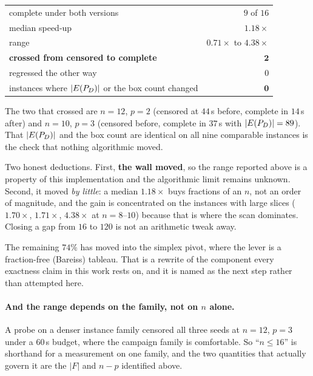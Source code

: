 \documentclass[11pt,a4paper]{article}
\begin{document}
\begin{center}
\begin{tabular}{lr}
\toprule
complete under both versions & $9$ of $16$ \\
\quad median speed-up & $\mathbf{1.18\times}$ \\
\quad range & $0.71\times$ to $4.38\times$ \\
\midrule
\textbf{crossed from censored to complete} & $\mathbf{2}$ \\
regressed the other way & $0$ \\
\midrule
instances where $|E(P_{D})|$ or the box count changed & $\mathbf{0}$ \\
\bottomrule
\end{tabular}
\end{center}

\noindent
The two that crossed are $n{=}12$, $p{=}2$ (censored at $44$\,s before, complete
in $14$\,s after) and $n{=}10$, $p{=}3$ (censored before, complete in $37$\,s
with $|E(P_{D})| = 89$).  That $|E(P_{D})|$ and the box count are identical on all nine
comparable instances is the check that nothing algorithmic moved.

Two honest deductions.  First, \textbf{the wall moved}, so the range reported
above is a property of this implementation and the algorithmic limit remains
unknown.  Second, it moved \emph{by little}: a median $1.18\times$ buys
fractions of an $n$, not an order of magnitude, and the gain is concentrated on
the instances with large slices ($1.70\times$, $1.71\times$, $4.38\times$ at
$n = 8$--$10$) because that is where the scan dominates.  Closing a gap from
$16$ to $120$ is not an arithmetic tweak away.

The remaining $74\%$ has moved into the simplex pivot, where the lever is a
fraction-free (Bareiss) tableau.  That is a rewrite of the component every
exactness claim in this work rests on, and it is named as the next step rather
than attempted here.

\paragraph{And the range depends on the family, not on $n$ alone.}
A probe on a denser instance family censored all three seeds at $n = 12$,
$p = 3$ under a $60$\,s budget, where the campaign family is comfortable.  So
``$n \leqslant 16$'' is shorthand for a measurement on one family, and the two
quantities that actually govern it are the $|F|$ and $n - p$ identified above.
\end{document}
